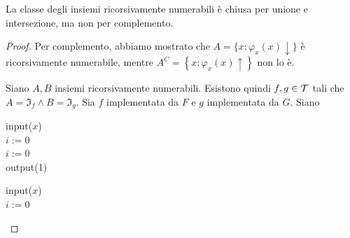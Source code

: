 \begin{theor}
	La classe degli insiemi ricorsivamente numerabili è chiusa per unione e intersezione, ma non per complemento.
\end{theor}
\begin{proof}
	Per complemento, abbiamo mostrato che $A=\{x: \varphi_x (x) \downarrow\}$ è ricorsivamente numerabile, mentre $A^C = \left\{x: \varphi_x (x) \uparrow\right\}$ non lo è.

	Siano $A,B$ insiemi ricorsivamente numerabili. Esistono quindi $f,g \in \mathcal{T}$ tali che $A = \Im_f \wedge B = \Im_g$. Sia $f$ implementata da $F$ e $g$ implementata da $G$. Siano
	\begin{center}
		\begin{minipage}{.45\textwidth}
			\begin{tcolorbox}[
				colback=white,
				sharp corners,
				boxrule=.3mm,
				left=20pt,
				top=0pt,
				bottom=0pt,
				title=$P_i$,
				colbacktitle=white,
				coltitle=black
				]
				\begin{algorithm}[H]
					input($x$) \\
					$i := 0$ \\
					$i := 0$ \\
					output(1)
				\end{algorithm}
			\end{tcolorbox}
		\end{minipage}
		\begin{minipage}{.45\textwidth}
			\begin{tcolorbox}[
				colback=white,
				sharp corners,
				boxrule=.3mm,
				left=20pt,
				top=0pt,
				bottom=0pt,
				title=$P_u$,
				colbacktitle=white,
				coltitle=black
				]
				\begin{algorithm}[H]
					input($x$) \\
					$i := 0$ \\
				\end{algorithm}
			\end{tcolorbox}

\end{minipage}
\end{center}
\end{proof}
